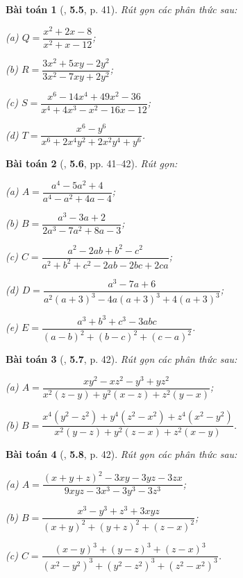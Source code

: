 \documentclass{article}
\numberwithin{equation}{section}
\newtheorem{baitoan}{Bài toán}
\begin{document}
\begin{baitoan}[\cite{Binh_Nam_Ngoc_Son_Toan_8_Dai_So}, \textbf{5.5}, p. 41]
	Rút gọn các phân thức sau:
	\begin{enumerate*}
		\item[(a)] $Q = \dfrac{x^2 + 2x - 8}{x^2 + x - 12}$;
		\item[(b)] $R = \dfrac{3x^2 + 5xy - 2y^2}{3x^2 - 7xy + 2y^2}$;
		\item[(c)] $S = \dfrac{x^6 - 14x^4 + 49x^2 - 36}{x^4 + 4x^3 - x^2 - 16x - 12}$;
		\item[(d)] $T = \dfrac{x^6 - y^6}{x^6 + 2x^4y^2 + 2x^2y^4 + y^6}$.
	\end{enumerate*}
\end{baitoan}

\begin{baitoan}[\cite{Binh_Nam_Ngoc_Son_Toan_8_Dai_So}, \textbf{5.6}, pp. 41--42]
	Rút gọn:
	\begin{enumerate*}
		\item[(a)] $A = \dfrac{a^4 - 5a^2 + 4}{a^4 - a^2 + 4a - 4}$;
		\item[(b)] $B = \dfrac{a^3 - 3a + 2}{2a^3 - 7a^2 + 8a - 3}$;
		\item[(c)] $C = \dfrac{a^2 - 2ab + b^2 - c^2}{a^2 + b^2 + c^2 - 2ab - 2bc + 2ca}$;
		\item[(d)] $D = \dfrac{a^3 - 7a + 6}{a^2(a + 3)^3 - 4a(a + 3)^3 + 4(a + 3)^3}$;
		\item[(e)] $E = \dfrac{a^3 + b^3 + c^3 - 3abc}{(a - b)^2 + (b - c)^2 + (c - a)^2}$.
	\end{enumerate*}
\end{baitoan}

\begin{baitoan}[\cite{Binh_Nam_Ngoc_Son_Toan_8_Dai_So}, \textbf{5.7}, p. 42]
	Rút gọn các phân thức sau:
	\begin{enumerate*}
		\item[(a)] $A = \dfrac{xy^2 - xz^2 - y^3 + yz^2}{x^2(z - y) + y^2(x - z) + z^2(y - x)}$;
		\item[(b)] $B = \dfrac{x^4(y^2 - z^2) + y^4(z^2 - x^2) + z^4(x^2 - y^2)}{x^2(y - z) + y^2(z - x) + z^2(x - y)}$.
	\end{enumerate*}
\end{baitoan}

\begin{baitoan}[\cite{Binh_Nam_Ngoc_Son_Toan_8_Dai_So}, \textbf{5.8}, p. 42]
	Rút gọn các phân thức sau:
	\begin{enumerate*}
		\item[(a)] $A = \dfrac{(x + y + z)^2 - 3xy - 3yz - 3zx}{9xyz - 3x^3 - 3y^3 - 3z^3}$;
		\item[(b)] $B = \dfrac{x^3 - y^3 + z^3 + 3xyz}{(x + y)^2 + (y + z)^2 + (z - x)^2}$;
		\item[(c)] $C = \dfrac{(x - y)^3 + (y - z)^3 + (z - x)^3}{(x^2 - y^2)^3 + (y^2 - z^2)^3 + (z^2 - x^2)^3}$.
	\end{enumerate*}
\end{baitoan}
\end{document}
